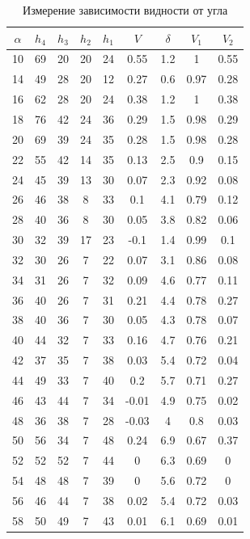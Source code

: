 \documentclass[12pt]{kiarticle}
\begin{document}
\begin{table}[h!]
	\caption{Измерение зависимости видности от угла}
	\begin{center}
		\begin{tabular}{|c|c|c|c|c|c|c|c|c|}
			\hline
			$ 	\alpha  $ & $ h_4 $ &  $ h_3 $& $ h_2 $ & $ h_1 $ & $ V $ & $  \delta  $ & $ V_1 $ & $ V_2 $ \\
			\hline
		10 & 69 & 20 & 20 & 24 & 0.55 & 1.2 & 1 & 0.55 \\
		14 & 49 & 28 & 20 & 12 & 0.27 & 0.6 & 0.97 & 0.28 \\
		16 & 62 & 28 & 20 & 24 & 0.38 & 1.2 & 1 & 0.38 \\
		18 & 76 & 42 & 24 & 36 & 0.29 & 1.5 & 0.98 & 0.29 \\
		20 & 69 & 39 & 24 & 35 & 0.28 & 1.5 & 0.98 & 0.28 \\
		22 & 55 & 42 & 14 & 35 & 0.13 & 2.5 & 0.9 & 0.15 \\
		24 & 45 & 39 & 13 & 30 & 0.07 & 2.3 & 0.92 & 0.08 \\
		26 & 46 & 38 & 8 & 33 & 0.1 & 4.1 & 0.79 & 0.12 \\
		28 & 40 & 36 & 8 & 30 & 0.05 & 3.8 & 0.82 & 0.06 \\
		30 & 32 & 39 & 17 & 23 & -0.1 & 1.4 & 0.99 & 0.1 \\
		32 & 30 & 26 & 7 & 22 & 0.07 & 3.1 & 0.86 & 0.08 \\
		34 & 31 & 26 & 7 & 32 & 0.09 & 4.6 & 0.77 & 0.11 \\
		36 & 40 & 26 & 7 & 31 & 0.21 & 4.4 & 0.78 & 0.27 \\
		38 & 40 & 36 & 7 & 30 & 0.05 & 4.3 & 0.78 & 0.07 \\
		40 & 44 & 32 & 7 & 33 & 0.16 & 4.7 & 0.76 & 0.21 \\
		42 & 37 & 35 & 7 & 38 & 0.03 & 5.4 & 0.72 & 0.04 \\
		44 & 49 & 33 & 7 & 40 & 0.2 & 5.7 & 0.71 & 0.27 \\
		46 & 43 & 44 & 7 & 34 & -0.01 & 4.9 & 0.75 & 0.02 \\
		48 & 36 & 38 & 7 & 28 & -0.03 & 4 & 0.8 & 0.03 \\
		50 & 56 & 34 & 7 & 48 & 0.24 & 6.9 & 0.67 & 0.37 \\
		52 & 52 & 52 & 7 & 44 & 0 & 6.3 & 0.69 & 0 \\
		54 & 48 & 48 & 7 & 39 & 0 & 5.6 & 0.72 & 0 \\
		56 & 46 & 44 & 7 & 38 & 0.02 & 5.4 & 0.72 & 0.03 \\
		58 & 50 & 49 & 7 & 43 & 0.01 & 6.1 & 0.69 & 0.01 \\

\end{tabular}
\end{center}
\end{table}
\end{document}

